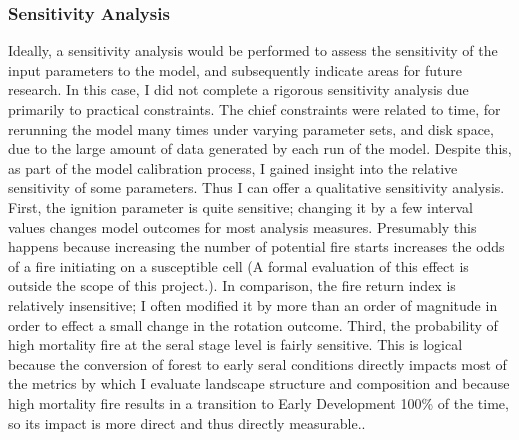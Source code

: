 \subsubsection*{Sensitivity Analysis} Ideally, a sensitivity analysis would be performed to assess the sensitivity of the input parameters to the model, and subsequently indicate areas for future research. In this case, I did not complete a rigorous sensitivity analysis due primarily to practical constraints. The chief constraints were related to time, for rerunning the model many times under varying parameter sets, and disk space, due to the large amount of data generated by each run of the model. Despite this, as part of the model calibration process, I gained insight into the relative sensitivity of some parameters. Thus I can offer a qualitative sensitivity analysis. First, the ignition parameter is quite sensitive; changing it by a few interval values changes model outcomes for most analysis measures. Presumably this happens because increasing the number of potential fire starts increases the odds of a fire initiating on a susceptible cell (A formal evaluation of this effect is outside the scope of this project.). In comparison, the fire return index is relatively insensitive; I often modified it by more than an order of magnitude in order to effect a small change in the rotation outcome. Third, the probability of high mortality fire at the seral stage level is fairly sensitive. This is logical because the conversion of forest to early seral conditions directly impacts most of the metrics by which I evaluate landscape structure and composition and because high mortality fire results in a transition to Early Development 100\% of the time, so its impact is more direct and thus directly measurable..

